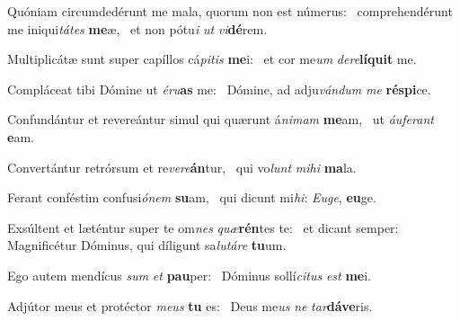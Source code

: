 \item Quóniam circumdedérunt me mala, quorum non est númerus:~\pscross{} comprehendérunt me iniqui\textit{tátes} \textbf{me}æ,~\psstar{} et non pótu\textit{i} \textit{ut} \textit{vi}\textbf{dé}rem.
\item Multiplicátæ sunt super capíllos cá\textit{pitis} \textbf{me}i:~\psstar{} et cor me\textit{um} \textit{dere}\textbf{lí}\textbf{quit} me.
\item Compláceat tibi Dómine ut \textit{éru}\textbf{as} me:~\psstar{} Dómine, ad adju\textit{vándum} \textit{me} \textbf{ré}\textbf{spi}ce.
\item Confundántur et revereántur simul qui quærunt á\textit{nimam} \textbf{me}am,~\psstar{} ut \textit{áuferant} \textbf{e}am.
\item Convertántur retrórsum et re\textit{vere}\textbf{án}tur,~\psstar{} qui vo\textit{lunt} \textit{mihi} \textbf{ma}la.
\item Ferant conféstim confusi\textit{ónem} \textbf{su}am,~\psstar{} qui dicunt mi\textit{hi}: \textit{Euge}, \textbf{eu}ge.
\item Exsúltent et læténtur super te om\textit{nes} \textit{quæ}\textbf{rén}tes te:~\psstar{} et dicant semper: Magnificétur Dóminus, qui díligunt sa\textit{lutáre} \textbf{tu}um.
\item Ego autem mendícus \textit{sum} \textit{et} \textbf{pau}per:~\psstar{} Dóminus sollí\textit{citus} \textit{est} \textbf{me}i.
\item Adjútor meus et protéctor \textit{meus} \textbf{tu} es:~\psstar{} Deus me\textit{us} \textit{ne} \textit{tar}\textbf{dá}\textbf{ve}ris.
